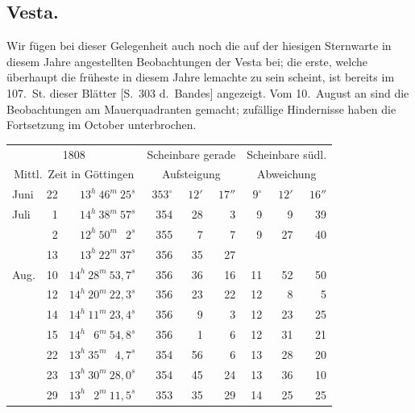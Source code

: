 \documentclass[12pt,a4paper]{book}
\begin{document}
\newpage
\subsection*{Vesta.}

Wir f\"ugen bei dieser Gelegenheit auch noch die auf der hiesigen Sternwarte in diesem Jahre angestellten Beobachtungen der Vesta bei; die erste, welche \"uberhaupt die fr\"uheste in diesem Jahre lemachte zu sein scheint, ist bereits im 107.~St. dieser Bl\"atter [S.~303 d.~Bandes] angezeigt. Vom 10.~August an sind die Beobachtungen am Mauerquadranten gemacht; zuf\"allige Hindernisse haben die Fortsetzung im October unterbrochen.

\begin{small}
\begin{center}
\begin{tabular}{llr@{\hspace{1.5em}}rrr@{\hspace{1.5em}}rrr}
\toprule
\multicolumn{3}{c}{1808} & \multicolumn{3}{c}{Scheinbare gerade} & \multicolumn{3}{c}{Scheinbare s\"udl.} \\
\multicolumn{3}{c}{Mittl.~Zeit in G\"ottingen} & \multicolumn{3}{c}{Aufsteigung} & \multicolumn{3}{c}{Abweichung} \\
\midrule
Juni & 22 & $13^{h}\ 46^{m}\ 25^{s}$ & $353^{\circ}$ & $12'$ & $17''$ & $9^{\circ}$ & $12'$ & $16''$ \\
Juli & ~1 & $14^{h}\ 38^{m}\ 57^{s}$ & 354 & 28 & ~3 & 9 & ~9 & 39 \\
& ~2 & $12^{h}\ 50^{m}\ \phantom{0}2^{s}$ & 355 & ~7 & ~7 & 9 & 27 & 40 \\
& 13 & $13^{h}\ 22^{m}\ 37^{s}$ & 356 & 35 & 27 & & & \\
Aug. & 10 & $14^{h}\ 28^{m}\ 53{,}7^{s}$ & 356 & 36 & 16 & 11 & 52 & 50 \\
& 12 & $14^{h}\ 20^{m}\ 22{,}3^{s}$ & 356 & 23 & 22 & 12 & ~8 & ~5 \\
& 14 & $14^{h}\ 11^{m}\ 23{,}4^{s}$ & 356 & ~9 & ~3 & 12 & 23 & 25 \\
& 15 & $14^{h}\ \phantom{0}6^{m}\ 54{,}8^{s}$ & 356 & ~1 & ~6 & 12 & 31 & 21 \\
& 22 & $13^{h}\ 35^{m}\ \phantom{0}4{,}7^{s}$ & 354 & 56 & ~6 & 13 & 28 & 20 \\
& 23 & $13^{h}\ 30^{m}\ 28{,}0^{s}$ & 354 & 45 & 24 & 13 & 36 & 10 \\
& 29 & $13^{h}\ \phantom{0}2^{m}\ 11{,}5^{s}$ & 353 & 35 & 29 & 14 & 25 & 25 \\

\end{tabular}
\end{center}
\end{small}
\end{document}
